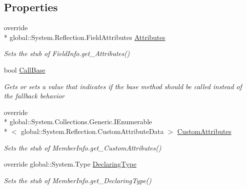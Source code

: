 \subsection*{Properties}
\begin{DoxyCompactItemize}
\item 
override \\*
global\-::\-System.\-Reflection.\-Field\-Attributes \hyperlink{class_system_1_1_reflection_1_1_fakes_1_1_stub_field_info_aec3ac521e187a4b99e18ef67ebf96130}{Attributes}
\begin{DoxyCompactList}\small\item\em Sets the stub of Field\-Info.\-get\-\_\-\-Attributes()\end{DoxyCompactList}\item 
bool \hyperlink{class_system_1_1_reflection_1_1_fakes_1_1_stub_field_info_a99ca125daf187dd6457702d332644eb1}{Call\-Base}
\begin{DoxyCompactList}\small\item\em Gets or sets a value that indicates if the base method should be called instead of the fallback behavior\end{DoxyCompactList}\item 
override \\*
global\-::\-System.\-Collections.\-Generic.\-I\-Enumerable\\*
$<$ global\-::\-System.\-Reflection.\-Custom\-Attribute\-Data $>$ \hyperlink{class_system_1_1_reflection_1_1_fakes_1_1_stub_field_info_a096e9fd3f69e79e9b9aa4b821dac4923}{Custom\-Attributes}
\begin{DoxyCompactList}\small\item\em Sets the stub of Member\-Info.\-get\-\_\-\-Custom\-Attributes()\end{DoxyCompactList}\item 
override global\-::\-System.\-Type \hyperlink{class_system_1_1_reflection_1_1_fakes_1_1_stub_field_info_a40e62604c293d1e5ac7ff4b8a1039aa9}{Declaring\-Type}
\begin{DoxyCompactList}\small\item\em Sets the stub of Member\-Info.\-get\-\_\-\-Declaring\-Type()\end{DoxyCompactList}\item 

\end{DoxyCompactItemize}
